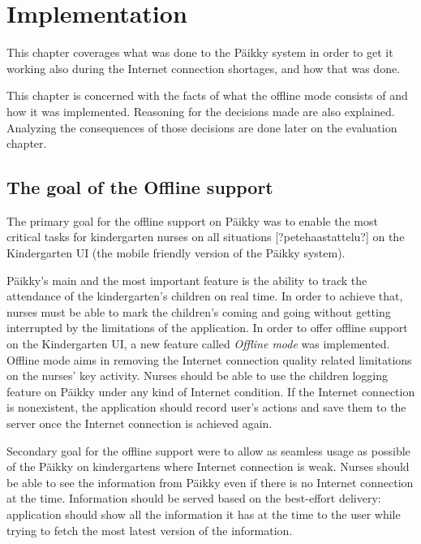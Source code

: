 
\chapter{Implementation}
This chapter coverages what was done to the Päikky system in order to get it working also during the Internet connection shortages, and how that was done. 

This chapter is concerned with the facts of what the offline mode consists of and how it was implemented. Reasoning for the decisions made are also explained. Analyzing the consequences of those decisions are done later on the evaluation chapter.

\section{The goal of the Offline support}
The primary goal for the offline support on Päikky was to enable the most critical tasks for kindergarten nurses on all situations [?petehaastattelu?] on the Kindergarten UI (the mobile friendly version of the Päikky system). 

Päikky's main and the most important feature is the ability to track the attendance of the kindergarten's children on real time. In order to achieve that, nurses must be able to mark the children's coming and going without getting interrupted by the limitations of the application. In order to offer offline support on the Kindergarten UI, a new feature called \textit{Offline mode} was implemented. Offline mode aims in removing the Internet connection quality related limitations on the nurses' key activity. Nurses should be able to use the children logging feature on Päikky under any kind of Internet condition. If the Internet connection is nonexistent, the application should record user's actions and save them to the server once the Internet connection is achieved again.

Secondary goal for the offline support were to allow as seamless usage as possible of the Päikky on kindergartens where Internet connection is weak. Nurses should be able to see the information from Päikky even if there is no Internet connection at the time. Information should be served based on the best-effort delivery: application should show all the information it has at the time to the user while trying to fetch the most latest version of the information.

